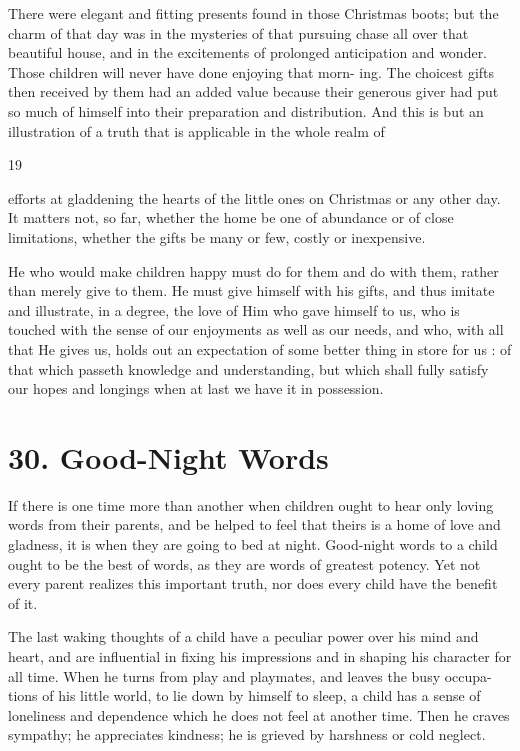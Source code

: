 \documentclass[
]{book}
\begin{document}
There were elegant and fitting presents found in those Christmas boots; but the charm of that day was in the mysteries of that pursuing chase all over that beautiful house, and in the excitements of prolonged anticipation and wonder. Those children will never have done enjoying that morn- ing. The choicest gifts then received by them had an added value because their generous giver had put so much of himself into their preparation and distribution. And this is but an illustration of a truth that is applicable in the whole realm of

19

efforts at gladdening the hearts of the little ones on Christmas or any other day. It matters not, so far, whether the home be one of abundance or of close limitations, whether the gifts be many or few, costly or inexpensive.

He who would make children happy must do for them and do with them, rather than merely give to them. He must give himself with his gifts, and thus imitate and illustrate, in a degree, the love of Him who gave himself to us, who is touched with the sense of our enjoyments as well as our needs, and who, with all that He gives us, holds out an expectation of some better thing in store for us : of that which passeth knowledge and understanding, but which shall fully satisfy our hopes and longings when at last we have it in possession.

\hypertarget{good-night-words}{%
\chapter{30. Good-Night Words}\label{good-night-words}}

If there is one time more than another when children ought to hear only loving words from their parents, and be helped to feel that theirs is a home of love and gladness, it is when they are going to bed at night. Good-night words to a child ought to be the best of words, as they are words of greatest potency. Yet not every parent realizes this important truth, nor does every child have the benefit of it.

The last waking thoughts of a child have a peculiar power over his mind and heart, and are influential in fixing his impressions and in shaping his character for all time. When he turns from play and playmates, and leaves the busy occupa- tions of his little world, to lie down by himself to sleep, a child has a sense of loneliness and dependence which he does not feel at another time. Then he craves sympathy; he appreciates kindness; he is grieved by harshness or cold neglect.
\end{document}
